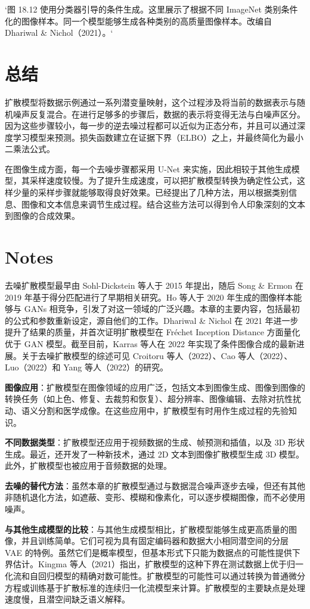 `图 18.12 使用分类器引导的条件生成。这里展示了根据不同 ImageNet 类别条件化的图像样本。同一个模型能够生成各种类别的高质量图像样本。改编自 Dhariwal \& Nichol（2021）。`

\section{总结}
扩散模型将数据示例通过一系列潜变量映射，这个过程涉及将当前的数据表示与随机噪声反复混合。在进行足够多的步骤后，数据的表示将变得无法与白噪声区分。因为这些步骤较小，每一步的逆去噪过程都可以近似为正态分布，并且可以通过深度学习模型来预测。损失函数建立在证据下界（ELBO）之上，并最终简化为最小二乘法公式。

在图像生成方面，每一个去噪步骤都采用 U-Net 来实施，因此相较于其他生成模型，其采样速度较慢。为了提升生成速度，可以把扩散模型转换为确定性公式，这样少量的采样步骤就能够取得良好效果。已经提出了几种方法，用以根据类别信息、图像和文本信息来调节生成过程。结合这些方法可以得到令人印象深刻的文本到图像的合成效果。

\section{Notes}
去噪扩散模型最早由 Sohl-Dickstein 等人于 2015 年提出，随后 Song \& Ermon 在 2019 年基于得分匹配进行了早期相关研究。Ho 等人于 2020 年生成的图像样本能够与 GANs 相竞争，引发了对这一领域的广泛兴趣。本章的主要内容，包括最初的公式和参数重新设定，源自他们的工作。Dhariwal \& Nichol 在 2021 年进一步提升了结果的质量，并首次证明扩散模型在 Fréchet Inception Distance 方面量化优于 GAN 模型。截至目前，Karras 等人在 2022 年实现了条件图像合成的最新进展。关于去噪扩散模型的综述可见 Croitoru 等人（2022）、Cao 等人（2022）、Luo（2022）和 Yang 等人（2022）的研究。

\textbf{图像应用}：扩散模型在图像领域的应用广泛，包括文本到图像生成、图像到图像的转换任务（如上色、修复、去裁剪和恢复）、超分辨率、图像编辑、去除对抗性扰动、语义分割和医学成像。在这些应用中，扩散模型有时用作生成过程的先验知识。

\textbf{不同数据类型}：扩散模型还应用于视频数据的生成、帧预测和插值，以及 3D 形状生成。最近，还开发了一种新技术，通过 2D 文本到图像扩散模型生成 3D 模型。此外，扩散模型也被应用于音频数据的处理。

\textbf{去噪的替代方法}：虽然本章的扩散模型通过与数据混合噪声逐步去噪，但还有其他非随机退化方法，如遮蔽、变形、模糊和像素化，可以逐步模糊图像，而不必使用噪声。

\textbf{与其他生成模型的比较}：与其他生成模型相比，扩散模型能够生成更高质量的图像，并且训练简单。它们可视为具有固定编码器和数据大小相同潜空间的分层 VAE 的特例。虽然它们是概率模型，但基本形式下只能为数据点的可能性提供下界估计。Kingma 等人（2021）指出，扩散模型的这种下界在测试数据上优于归一化流和自回归模型的精确对数可能性。扩散模型的可能性可以通过转换为普通微分方程或训练基于扩散标准的连续归一化流模型来计算。扩散模型的主要缺点是处理速度慢，且潜空间缺乏语义解释。

